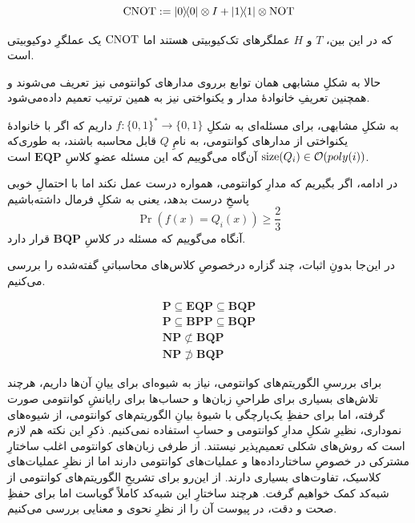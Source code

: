 \begin{equation}
    \CNOT := \dyad{0} \otimes I + \dyad{1} \otimes \NOT 
\end{equation} 

که در این بین، \(T\) و \(H\) عملگرهای تک‌کیوبیتی هستند اما  \(\operatorname{CNOT}\) یک عملگرِ دوکیوبیتی است.

حالا به شکلِ مشابهی همان توابع برروی مدارهای کوانتومی نیز تعریف می‌شوند و همچنین تعریفِ خانوادهٔ مدار و یکنواختی نیز به همین ترتیب تعمیم داده‌می‌شود.
 

به شکلِ مشابهی، برای مسئله‌ای به شکلِ 
\( f: \{ 0, 1\}^* \to \{ 0, 1\}\)
داریم 
که اگر با خانوادهٔ یکنواختی از مدارهای کوانتومی، به نامِ
\( Q \)
قابل محاسبه باشند، به طوری‌که 
\( \operatorname{size}(Q_i) \in \mathcal{O}(poly(i)) \) 
آن‌گاه می‌گوییم که این مسئله عضوِ کلاسِ
\( \mathbf{EQP} \)
است.

در ادامه، اگر بگیریم که مدارِ کوانتومی، همواره درست عمل نکند اما با احتمالِ خوبی پاسخِ درست بدهد، یعنی به شکلِ فرمال داشته‌باشیم
\begin{equation}
    \Pr(f(x) = Q_i(x)) \ge \frac{2}{3} 
\end{equation} 
آنگاه می‌گوییم که مسئله در کلاسِ
\( \mathbf{BQP} \)
قرار دارد.

در این‌جا بدونِ اثبات، چند گزاره درخصوصِ کلاس‌های محاسباتیِ گفته‌شده را بررسی می‌کنیم.

\begin{eqnarray}
    \mathbf{P} \subseteq \mathbf{EQP} \subseteq \mathbf{BQP} \\ 
    \mathbf{P} \subseteq \mathbf{BPP} \subseteq \mathbf{BQP} \\
    \mathbf{NP} \not\subset \mathbf{BQP} \\
    \mathbf{NP} \not\supset \mathbf{BQP}
\end{eqnarray}

برای بررسیِ الگوریتم‌های کوانتومی، نیاز به شیوه‌ای برای ییانِ آن‌ها داریم، هرچند تلاش‌های بسیاری برای طراحیِ زبان‌ها و حساب‌ها برای رایانشِ کوانتومی صورت گرفته، اما برای حفظِ یک‌پارچگی با شیوهٔ بیانِ الگوریتم‌های کوانتومی، از شیوه‌های نموداری، نظیرِ شکلِ مدارِ کوانتومی و حسابِ 
استفاده نمی‌کنیم.
ذکرِ این نکته هم لازم است که روش‌های شکلی تعمیم‌پذیر نیستند. از طرفی زبان‌های کوانتومی اغلب ساختارِ مشترکی در خصوصِ ساختارداده‌ها و عملیات‌های کوانتومی دارند اما از نظرِ عملیات‌های کلاسیک، تفاوت‌های بسیاری دارند. از این‌رو برای تشریحِ الگوریتم‌های کوانتومی از شبه‌کد کمک خواهیم گرفت. هرچند ساختارِ این شبه‌کد کاملاً گویاست اما برای حفظِ صحت و دقت، در پیوست آن را از نظرِ نحوی و معنایی بررسی می‌کنیم.

